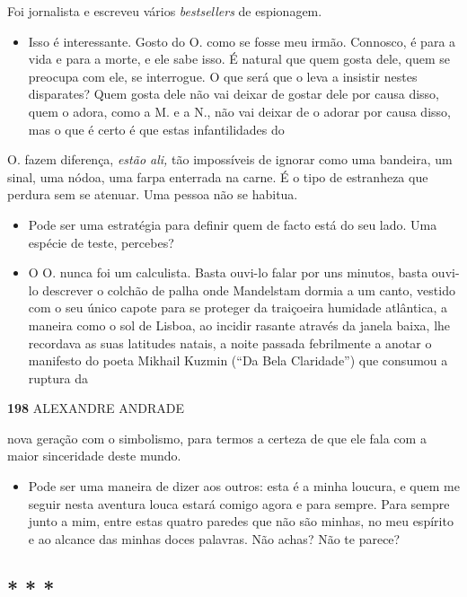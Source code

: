Foi jornalista e escreveu vários \emph{bestsellers }de espionagem.

\begin{itemize}
\tightlist
\item
  Isso é interessante. Gosto do O. como se fosse meu irmão. Connosco, é
  para a vida e para a morte, e ele sabe isso. É natural que quem gosta
  dele, quem se preocupa com ele, se interrogue. O que será que o leva a
  insistir nestes disparates? Quem gosta dele não vai deixar de gostar
  dele por causa disso, quem o adora, como a M. e a N., não vai deixar
  de o adorar por causa disso, mas o que é certo é que estas
  infantilidades do
\end{itemize}

O. fazem diferença, \emph{estão ali, }tão impossíveis de ignorar como
uma bandeira, um sinal, uma nódoa, uma farpa enterrada na carne. É o
tipo de estranheza que perdura sem se atenuar. Uma pessoa não se
habitua.

\begin{itemize}
\tightlist
\item
  Pode ser uma estratégia para definir quem de facto está do seu lado.
  Uma espécie de teste, percebes?
\item
  O O. nunca foi um calculista. Basta ouvi-lo falar por uns minutos,
  basta ouvi-lo descrever o colchão de palha onde Mandelstam dormia a um
  canto, vestido com o seu único capote para se proteger da traiçoeira
  humidade atlântica, a maneira como o sol de Lisboa, ao incidir rasante
  através da janela baixa, lhe recordava as suas latitudes natais, a
  noite passada febrilmente a anotar o manifesto do poeta Mikhail Kuzmin
  (``Da Bela Claridade'') que consumou a ruptura da
\end{itemize}

\textbf{198 }ALEXANDRE ANDRADE

nova geração com o simbolismo, para termos a certeza de que ele fala com
a maior sinceridade deste mundo.

\begin{itemize}
\tightlist
\item
  Pode ser uma maneira de dizer aos outros: esta é a minha loucura, e
  quem me seguir nesta aventura louca estará comigo agora e para sempre.
  Para sempre junto a mim, entre estas quatro paredes que não são
  minhas, no meu espírito e ao alcance das minhas doces palavras. Não
  achas? Não te parece?
\end{itemize}

\subsection{* * *}

